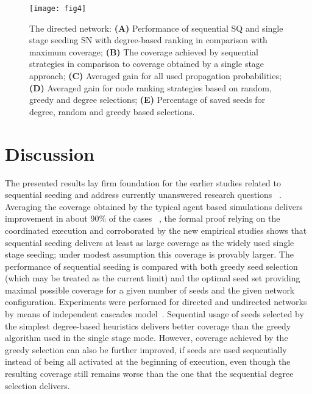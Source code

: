 \documentclass[11pt]{article} %
\begin{document}
\begin{figure*}[!htb]
\centering
\begin{minipage}{1\textwidth}
\centering
\texttt{[image: fig4]}

\caption{The directed network: \textbf{(A)} Performance of sequential SQ and single stage seeding SN with degree-based ranking in comparison with maximum coverage; \textbf{(B)} The coverage achieved by sequential strategies in comparison to coverage obtained by a single stage approach; \textbf{(C)} Averaged gain for all used propagation probabilities; \textbf{(D)} Averaged gain for node ranking strategies based on random, greedy and degree selections; \textbf{(E)} Percentage of saved seeds for degree, random and greedy based selections.}

\label{fig:fig4}
\end{minipage}\hfill
\end{figure*}

\section*{Discussion}

The presented results lay firm foundation for the earlier studies related to sequential seeding and address currently unanswered research questions ~\cite{jankowski2017balancing, jankowski2017dynamic, jankowski2017seeds}. Averaging the coverage obtained by the typical agent based simulations delivers improvement in about 90\% of the cases ~\cite{jankowski2017balancing}, the formal proof relying on the coordinated execution and corroborated by the new empirical studies shows that sequential seeding delivers at least as large coverage as the widely used single stage seeding; under modest assumption this coverage is provably larger. The performance of sequential seeding is compared with both greedy seed selection (which may be treated as the current limit) and the optimal seed set providing maximal possible coverage for a given number of seeds and the given network configuration. Experiments were performed for directed and undirected networks by means of independent cascades model~\cite{Kempe:2003}. Sequential usage of seeds selected by the simplest degree-based heuristics delivers better coverage than the greedy algorithm used in the single stage mode. However, coverage achieved by the greedy selection can also be further improved, if seeds are used sequentially instead of being all activated at the beginning of execution, even though the resulting coverage still remains worse than the one that the sequential degree selection delivers. 
\end{document}
